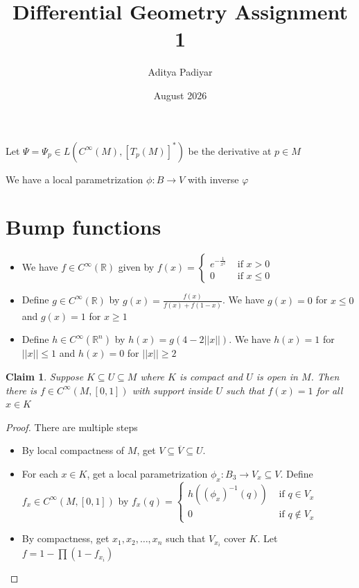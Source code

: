 \documentclass{article}
\title{Differential Geometry Assignment 1}
\author{Aditya Padiyar}
\date{August 2026}
\newtheorem{claim}{Claim}
\begin{document}
\maketitle

Let $\Psi = \Psi_p \in L(C^\infty(M),[T_p(M)]^*)$ be the derivative at $p \in M$

We have a local parametrization $\phi: B \to V$ with inverse $\varphi$

\section{Bump functions}

\begin{itemize}
    \item We have $f \in C^\infty(\mathbb{R})$ given by $f(x) = \begin{cases}
    e^{-\frac{1}{x^2}} & \text{ if } x > 0 \\
    0 & \text{ if } x \leq 0 
    \end{cases}$

    \item Define $g \in C^\infty(\mathbb{R})$ by $g(x) = \frac{f(x)}{f(x) + f(1-x)}$. We have $g(x) = 0$ for $x \leq 0$ and $g(x)=1$ for $x \geq 1$
    
    \item Define $h \in C^\infty(\mathbb{R}^n)$ by $h(x)= g(4-2||x||)$. We have $h(x)=1$ for $||x|| \leq 1$ and $h(x)=0$ for $||x|| \geq 2$
    
\end{itemize}

\begin{claim}
Suppose $K \subseteq U \subseteq M$ where $K$ is compact and $U$ is open in $M$. Then there is $f \in C^\infty(M,[0,1])$ with support inside $U$ such that $f(x)=1$ for all $x \in K$ 
\end{claim}

\begin{proof} There are multiple steps
    \begin{itemize}
        \item By local compactness of $M$, get $V \subseteq \overline{V} \subseteq U$.
        
        \item For each $x \in K$, get a local parametrization $\phi_x:B_3 \to V_x \subseteq V$. Define $f_x \in C^\infty(M,[0,1])$ by $f_x(q)=\begin{cases}
        h((\phi_x)^{-1}(q)) & \text{ if } q \in V_x \\
        0 & \text{ if } q \notin V_x
    \end{cases}$

    \item By compactness, get $x_1,x_2,\dots,x_n$ such that $V_{x_i}$ cover $K$. Let $f= 1 - \prod (1-f_{x_i})$
    \end{itemize}
    
\end{proof}
\end{document}
